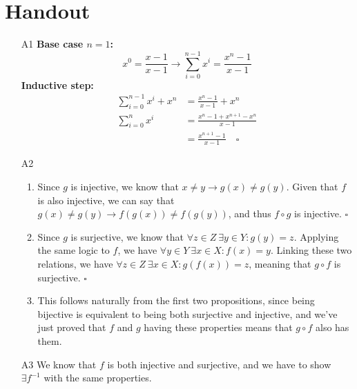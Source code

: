 \documentclass[12pt]{article}
\begin{document}
\pagebreak

\section{Handout}\label{sec:handout}
\begin{itemize}
    \item[A1] \textbf{Base case $n=1$:} \[x^0=\frac{x-1}{x-1} \rightarrow \sum_{i=0}^{n-1} x^i=\frac{x^n-1}{x-1}\]
        \textbf{Inductive step:} \begin{align*}
            \sum_{i=0}^{n-1} x^i + x^n & = \frac{x^n-1}{x-1}+x^n             \\
            \sum_{i=0}^{n} x^i         & = \frac{x^n-1+x^{n+1}-x^n}{x-1}     \\
                                       & = \frac{x^{n+1}-1}{x-1}\quad\square
        \end{align*}
    \item[A2] \begin{enumerate}[label=\alph*]
            \item Since $g$ is injective, we know that $x \ne y \rightarrow g(x) \ne g(y)$.
                  Given that $f$ is also injective, we can say that $g(x) \ne g(y) \rightarrow f(g(x)) \ne f(g(y))$,
                  and thus $f \circ g$ is injective. $\square$
            \item Since $g$ is surjective, we know that $\forall z \in Z\ \exists y \in Y: g(y)=z$.
                  Applying the same logic to $f$, we have $\forall y \in Y\ \exists x \in X: f(x)=y$.
                  Linking these two relations, we have $\forall z \in Z\ \exists x \in X: g(f(x))=z$,
                  meaning that $g \circ f$ is surjective. $\square$
            \item This follows naturally from the first two propositions, since being bijective
                  is equivalent to being both surjective and injective, and we've just proved that $f$ and $g$ having these properties
                  means that $g \circ f$ also has them.
        \end{enumerate}
    \item[A3] We know that $f$ is both injective and surjective, and we have to show $\exists f^{-1}$ with the same properties.


\end{itemize}
\end{document}
